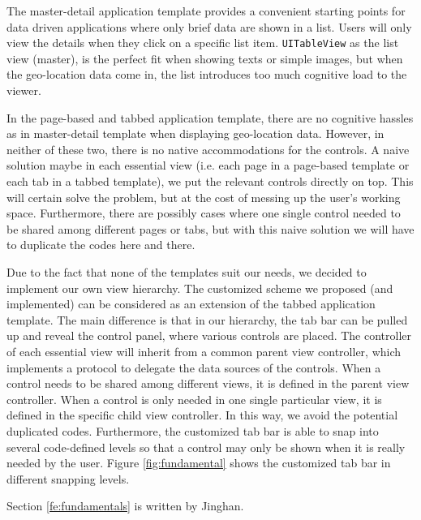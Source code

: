 \documentclass[12pt,a4paper]{article}
\begin{document}
            The master-detail application template provides a convenient starting points for data driven applications where only brief data are shown in a list. Users will only view the details when they click on a specific list item. \texttt{UITableView} as the list view (master), is the perfect fit when showing texts or simple images, but when the geo-location data come in, the list introduces too much cognitive load to the viewer. 
            
            In the page-based and tabbed application template, there are no cognitive hassles as in master-detail template when displaying geo-location data. However, in neither of these two, there is no native accommodations for the controls. A naive solution maybe in each essential view (i.e. each page in a page-based template or each tab in a tabbed template), we put the relevant controls directly on top. This will certain solve the problem, but at the cost of messing up the user's working space. Furthermore, there are possibly cases where one single control needed to be shared among different pages or tabs, but with this naive solution we will have to duplicate the codes here and there.
            
            Due to the fact that none of the templates suit our needs, we decided to implement our own view hierarchy. The customized scheme we proposed (and implemented) can be considered as an extension of the tabbed application template. The main difference is that in our hierarchy, the tab bar can be pulled up and reveal the control panel, where various controls are placed. The controller of each essential view will inherit from a common parent view controller, which implements a protocol to delegate the data sources of the controls. When a control needs to be shared among different views, it is defined in the parent view controller. When a control is only needed in one single particular view, it is defined in the specific child view controller. In this way, we avoid the potential duplicated codes. Furthermore, the customized tab bar is able to snap into several code-defined levels so that a control may only be shown when it is really needed by the user. Figure \ref{fig:fundamental} shows the customized tab bar in different snapping levels.
            
            \footnotesize
            Section \ref{fe:fundamentals} is written by Jinghan.
            \normalsize
            
\end{document}
